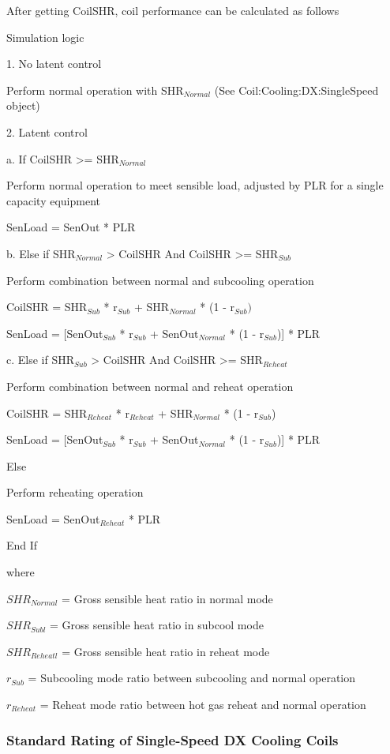After getting CoilSHR, coil performance can be calculated as follows

Simulation logic

1. No latent control

   Perform normal operation with SHR\(_{Normal}\) (See Coil:Cooling:DX:SingleSpeed object)

2. Latent control

a.  If CoilSHR >= SHR\(_{Normal}\)

   Perform normal operation to meet sensible load, adjusted by PLR for a single capacity equipment

	SenLoad = SenOut * PLR

b.  Else if SHR\(_{Normal}\) > CoilSHR And CoilSHR >= SHR\(_{Sub}\)

   Perform combination between normal and subcooling operation

  CoilSHR = SHR\(_{Sub}\) * r\(_{Sub}\) + SHR\(_{Normal}\) * (1 - r\(_{Sub})\)

  SenLoad = [SenOut\(_{Sub}\) * r\(_{Sub}\) + SenOut\(_{Normal}\) * (1 - r\(_{Sub}\))] * PLR

c.  Else if SHR\(_{Sub}\) > CoilSHR And CoilSHR >= SHR\(_{Reheat}\)

   Perform combination between normal and reheat operation

  CoilSHR = SHR\(_{Reheat}\) * r\(_{Reheat}\) + SHR\(_{Normal}\) * (1 - r\(_{Sub}\))

  SenLoad = [SenOut\(_{Sub}\) * r\(_{Sub}\) + SenOut\(_{Normal}\) * (1 - r\(_{Sub}\))] * PLR

Else

    Perform reheating operation

    SenLoad = SenOut\(_{Reheat}\) * PLR

End If

where

\(SHR_{Normal}\) = Gross sensible heat ratio in normal mode

\(SHR_{Subl}\) = Gross sensible heat ratio in subcool mode

\(SHR_{Reheatl}\) = Gross sensible heat ratio in reheat mode

\(r_{Sub}\) = Subcooling mode ratio between subcooling and normal operation

\(r_{Reheat}\) = Reheat mode ratio between hot gas reheat and normal operation

\subsubsection{Standard Rating of Single-Speed DX Cooling Coils}\label{standard-rating-of-single-speed-dx-cooling-coils}

